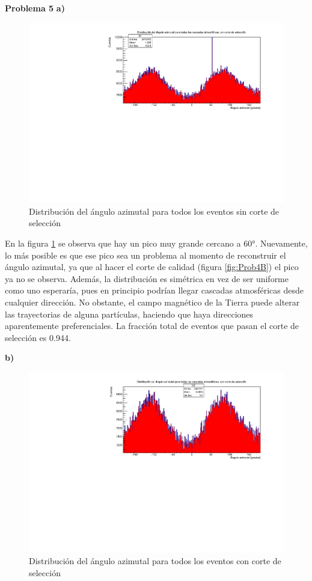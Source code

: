 \documentclass[11pt]{article}
\begin{document}
\textbf{Problema 5}
\textbf{a)}
\begin{figure}[H]
\centering
\includegraphics[width=1\textwidth]{../Figuras/Prob5A}
\caption{Distribución del ángulo azimutal para todos los eventos sin corte de selección}
\label{fig:Prob5A}
\end{figure}
En la figura \ref{fig:Prob5A} se observa que hay un pico muy grande cercano a 60°. Nuevamente, lo más posible es que ese pico sea un problema al momento de reconstruir el ángulo azimutal, ya que al hacer el corte de calidad (figura \ref{fig:Prob4B}) el pico ya no se observa. Además, la distribución es simétrica en vez de ser uniforme como uno esperaría, pues en principio podrían llegar cascadas atmosféricas desde cualquier dirección. No obstante, el campo magnético de la Tierra puede alterar las trayectorias de alguna partículas, haciendo que haya direcciones aparentemente preferenciales. La fracción total de eventos que pasan el corte de selección es 0.944. 

\textbf{b)}
\begin{figure}[H]
\centering
\includegraphics[width=1\textwidth]{../Figuras/Prob5B}
\caption{Distribución del ángulo azimutal para todos los eventos con corte de selección}
\label{fig:Prob5B}
\end{figure}
\end{document}
